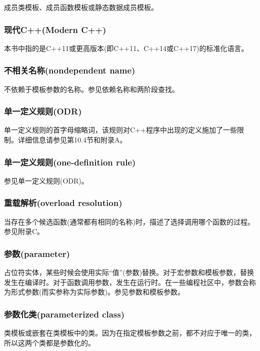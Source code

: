 成员类模板、成员函数模板或静态数据成员模板。

\subsubsection{现代C++(Modern C++)}

本书中指的是C++11或更高版本(即C++11、C++14或C++17)的标准化语言。

\subsubsection{不相关名称(nondependent name)}

不依赖于模板参数的名称。参见依赖名称和两阶段查找。

\subsubsection{单一定义规则(ODR)}

单一定义规则的首字母缩略词，该规则对C++程序中出现的定义施加了一些限制。详细信息请参见第10.4节和附录A。

\subsubsection{单一定义规则(one-definition rule)}

参见单一定义规则(ODR)。

\subsubsection{重载解析(overload resolution)}

当存在多个候选函数(通常都有相同的名称)时，描述了选择调用哪个函数的过程。参见附录C。

\subsubsection{参数(parameter)}

占位符实体，某些时候会使用实际“值”(参数)替换。对于宏参数和模板参数，替换发生在编译时。对于函数调用参数，发生在运行时。在一些编程社区中，参数会称为形式参数(而实参称为实际参数)。参见参数和模板参数。

\subsubsection{参数化类(parameterized class)}

类模板或嵌套在类模板中的类。因为在指定模板参数之前，都不对应于唯一的类，所以这两个类都是参数化的。

